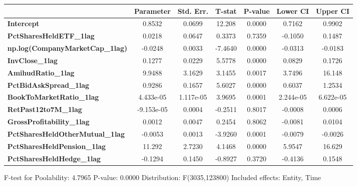\begin{center}
\begin{tabular}{lclc}
\bottomrule
\end{tabular}
\begin{tabular}{lcccccc}
                                        & \textbf{Parameter} & \textbf{Std. Err.} & \textbf{T-stat} & \textbf{P-value} & \textbf{Lower CI} & \textbf{Upper CI}  \\
\midrule
\textbf{Intercept}                      &       0.8532       &       0.0699       &      12.208     &      0.0000      &       0.7162      &       0.9902       \\
\textbf{PctSharesHeldETF\_1lag}         &       0.0218       &       0.0647       &      0.3373     &      0.7359      &      -0.1050      &       0.1487       \\
\textbf{np.log(CompanyMarketCap\_1lag)} &      -0.0248       &       0.0033       &     -7.4640     &      0.0000      &      -0.0313      &      -0.0183       \\
\textbf{InvClose\_1lag}                 &       0.1277       &       0.0229       &      5.5778     &      0.0000      &       0.0829      &       0.1726       \\
\textbf{AmihudRatio\_1lag}              &       9.9488       &       3.1629       &      3.1455     &      0.0017      &       3.7496      &       16.148       \\
\textbf{PctBidAskSpread\_1lag}          &       0.9286       &       0.1657       &      5.6027     &      0.0000      &       0.6037      &       1.2534       \\
\textbf{BookToMarketRatio\_1lag}        &     4.433e-05      &     1.117e-05      &      3.9695     &      0.0001      &     2.244e-05     &     6.622e-05      \\
\textbf{RetPast12to7M\_1lag}            &     -9.153e-05     &       0.0004       &     -0.2511     &      0.8017      &      -0.0008      &       0.0006       \\
\textbf{GrossProfitability\_1lag}       &       0.0012       &       0.0047       &      0.2454     &      0.8062      &      -0.0081      &       0.0104       \\
\textbf{PctSharesHeldOtherMutual\_1lag} &      -0.0053       &       0.0013       &     -3.9260     &      0.0001      &      -0.0079      &      -0.0026       \\
\textbf{PctSharesHeldPension\_1lag}     &       11.292       &       2.7230       &      4.1468     &      0.0000      &       5.9547      &       16.629       \\
\textbf{PctSharesHeldHedge\_1lag}       &      -0.1294       &       0.1450       &     -0.8927     &      0.3720      &      -0.4136      &       0.1548       \\
\bottomrule
\end{tabular}
\end{center}

F-test for Poolability: 4.7965 \newline
 P-value: 0.0000 \newline
 Distribution: F(3035,123800) \newline
  \newline
 Included effects: Entity, Time